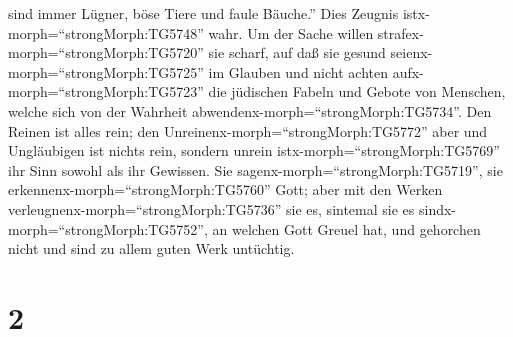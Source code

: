 sind immer Lügner, böse Tiere und faule Bäuche.''  Dies
Zeugnis istx-morph=``strongMorph:TG5748'' wahr. Um der Sache willen
strafex-morph=``strongMorph:TG5720'' sie scharf, auf daß sie gesund
seienx-morph=``strongMorph:TG5725'' im Glauben  und nicht
achten aufx-morph=``strongMorph:TG5723'' die jüdischen Fabeln und Gebote
von Menschen, welche sich von der Wahrheit
abwendenx-morph=``strongMorph:TG5734''.  Den Reinen ist
alles rein; den Unreinenx-morph=``strongMorph:TG5772'' aber und
Ungläubigen ist nichts rein, sondern unrein
istx-morph=``strongMorph:TG5769'' ihr Sinn sowohl als ihr Gewissen.
 Sie sagenx-morph=``strongMorph:TG5719'', sie
erkennenx-morph=``strongMorph:TG5760'' Gott; aber mit den Werken
verleugnenx-morph=``strongMorph:TG5736'' sie es, sintemal sie es
sindx-morph=``strongMorph:TG5752'', an welchen Gott Greuel hat, und
gehorchen nicht und sind zu allem guten Werk untüchtig.

\hypertarget{section-1}{%
\section{2}\label{section-1}}


